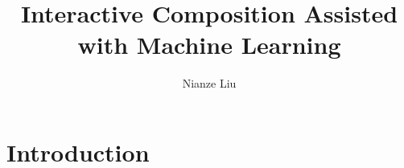 \documentclass[jou]{apa6}
\title{Interactive Composition Assisted with Machine Learning}
\author{Nianze Liu}
\affiliation{New York University}
\begin{document}
\maketitle

\section{Introduction}


\printbibliography
\end{document}
